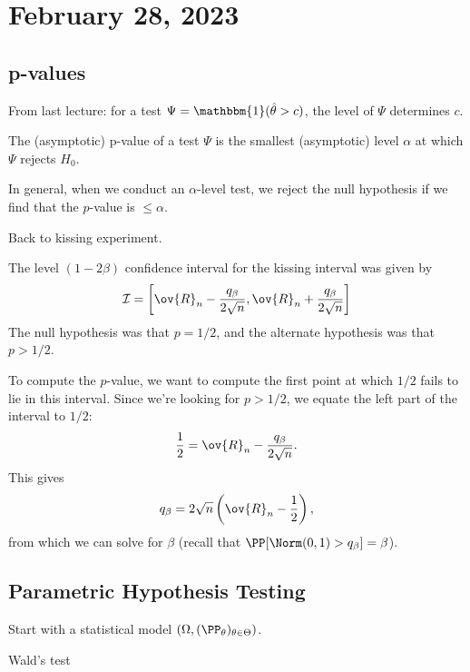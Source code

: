 \section{February 28, 2023}

\subsection{p-values}

From last lecture: for a test $\Psi = \mathbbm{1}(\hat{\theta} > c)$, the level of $\Psi$ determines $c$. 

\begin{definition}

The (asymptotic) \ac{p-value} of a test $\Psi$ is the smallest (asymptotic) level $\alpha$ at which $\Psi$ rejects $H_0$.
\end{definition}

In general, when we conduct an $\alpha$-level test, we reject the null hypothesis if we find that the $p$-value is $\leq \alpha$. 

\begin{example}
\exlabel

Back to kissing experiment.
\end{example}
The level $(1-2\beta)$ confidence interval for the kissing interval was given by 
\[\mathcal{I} = \left[\ov{R}_n - \frac{q_{\beta}}{2\sqrt{n}}, \ov{R}_n + \frac{q_{\beta}}{2\sqrt{n}}\right]\]
The null hypothesis was that $p=1/2$, and the alternate hypothesis was that $p>1/2$.

To compute the $p$-value, we want to compute the first point at which $1/2$ fails to lie in this interval. Since we're looking for $p>1/2$, we equate the left part of the interval to $1/2$:
\[\frac{1}{2} = \ov{R}_n - \frac{q_{\beta}}{2\sqrt{n}}.\]
This gives
\[q_{\beta} = 2\sqrt{n}\left(\ov{R}_n - \frac{1}{2}\right),\]
from which we can solve for $\beta$ (recall that $\PP[\Norm(0,1) > q_{\beta}] = \beta$).

\subsection{Parametric Hypothesis Testing}

Start with a statistical model $(\Omega, (\PP_{\theta})_{\theta\in \Theta})$. 

\begin{example}
\exlabel

Wald's test
\end{example}

